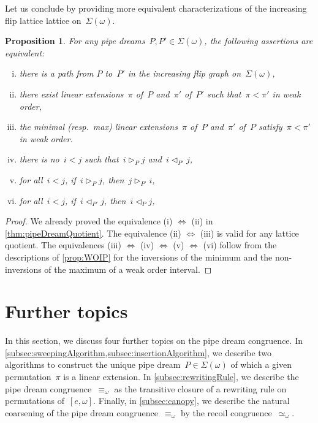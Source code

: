 \documentclass{amsart}
\newtheorem{proposition}[theorem]{Proposition}
\theoremstyle{definition}
\newcommand{\acyclicPipeDreams}{\Sigma} %
\newcommand{\less}{\vartriangleleft} %
\newcommand{\more}{\vartriangleright} %
\newcommand{\contactLess}[1]{\less_{#1}} %
\newcommand{\contactMore}[1]{\more_{#1}} %
\begin{document}
Let us conclude by providing more equivalent characterizations of the increasing flip lattice lattice on~$\acyclicPipeDreams(\omega)$.

\begin{proposition}
For any pipe dreams~$P, P' \in \acyclicPipeDreams(\omega)$, the following assertions are equivalent:
\begin{enumerate}[(i)]
\item there is a path from $P$ to~$P'$ in the increasing flip graph on~$\acyclicPipeDreams(\omega)$,
\item there exist linear extensions~$\pi$ of~$P$ and~$\pi'$ of~$P'$ such that~$\pi < \pi'$ in weak order,
\item the minimal (resp.~max) linear extensions~$\pi$ of~$P$ and~$\pi'$ of~$P$ satisfy~$\pi < \pi'$ in weak order.
\item there is no~$i < j$ such that~$i \contactMore{P} j$ and~$i \contactLess{P'} j$,
\item for all~$i < j$, if~$i \contactMore{P} j$, then~$j \contactMore{P'} i$,
\item for all~$i < j$, if~$i \contactLess{P'} j$, then~$i \contactLess{P} j$,
\end{enumerate}
\end{proposition}

\begin{proof}
We already proved the equivalence (i) $\Leftrightarrow$ (ii) in \cref{thm:pipeDreamQuotient}.
The equivalence (ii) $\Leftrightarrow$ (iii) is valid for any lattice quotient.
The equivalences (iii) $\Leftrightarrow$ (iv) $\Leftrightarrow$ (v) $\Leftrightarrow$ (vi) follow from the descriptions of \cref{prop:WOIP} for the inversions of the minimum and the non-inversions of the maximum of a weak order interval.
\end{proof}


\section{Further topics}
\label{sec:furtherTopics}

In this section, we discuss four further topics on the pipe dream congruence.
In \cref{subsec:sweepingAlgorithm,subsec:insertionAlgorithm}, we describe two algorithms to construct the unique pipe dream~$P \in \acyclicPipeDreams(\omega)$ of which a given permutation~$\pi$ is a linear extension.
In \cref{subsec:rewritingRule}, we describe the pipe dream congruence~$\equiv_\omega$ as the transitive closure of a rewriting rule on permutations of~$[e, \omega]$.
Finally, in \cref{subsec:canopy}, we describe the natural coarsening of the pipe dream congruence~$\equiv_\omega$ by the recoil congruence~$\simeq_\omega$.
\end{document}
